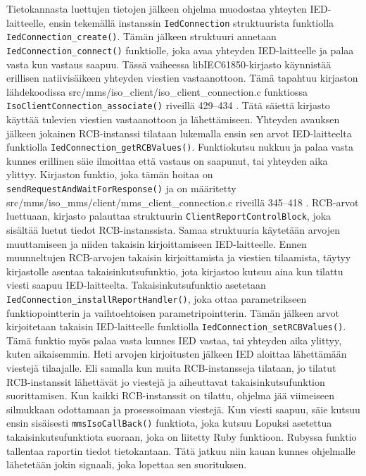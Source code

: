 Tietokannasta luettujen tietojen jälkeen ohjelma muodostaa yhteyten IED-laitteelle, ensin tekemällä instanssin \texttt{IedConnection} struktuurista funktiolla \texttt{IedConnection\_create()}. Tämän jälkeen struktuuri annetaan \texttt{IedConnection\_connect()} funktiolle, joka avaa yhteyden IED-laitteelle ja palaa vasta kun vastaus saapuu. Tässä vaiheessa libIEC61850-kirjasto käynnistää erillisen natiivisäikeen yhteyden viestien vastaanottoon. Tämä tapahtuu kirjaston lähdekoodissa src/mms/iso\_client/iso\_client\_connection.c funktiossa \texttt{IsoClientConnection\_associate()} riveillä 429--434 \cite{libIEC61850-repo}. Tätä säiettä kirjasto käyttää tulevien viestien vastaanottoon ja lähettämiseen. Yhteyden avauksen jälkeen jokainen RCB-instanssi tilataan lukemalla ensin sen arvot IED-laitteelta funktiolla \texttt{IedConnection\_getRCBValues()}. Funktiokutsu nukkuu ja palaa vasta kunnes erillinen säie ilmoittaa että vastaus on saapunut, tai yhteyden aika ylittyy. Kirjaston funktio, joka tämän hoitaa on \texttt{sendRequestAndWaitForResponse()} ja on määritetty src/mms/iso\_mms/client/mms\_client\_connection.c riveillä 345--418 \cite{libIEC61850-repo}. RCB-arvot luettuaan, kirjasto palauttaa struktuurin \texttt{ClientReportControlBlock}, joka sisältää luetut tiedot RCB-instanssista. Samaa struktuuria käytetään arvojen muuttamiseen ja niiden takaisin kirjoittamiseen IED-laitteelle. Ennen muunneltujen RCB-arvojen takaisin kirjoittamista ja viestien tilaamista, täytyy kirjastolle asentaa takaisinkutsufunktio, jota kirjastoo kutsuu aina kun tilattu viesti saapuu IED-laitteelta. Takaisinkutsufunktio asetetaan \texttt{IedConnection\_installReportHandler()}, joka ottaa parametrikseen funktiopointterin ja vaihtoehtoisen parametripointterin. Tämän jälkeen arvot kirjoitetaan takaisin IED-laitteelle funktiolla \texttt{IedConnection\_setRCBValues()}. Tämä funktio myös palaa vasta kunnes IED vastaa, tai yhteyden aika ylittyy, kuten aikaisemmin. Heti arvojen kirjoitusten jälkeen IED aloittaa lähettämään viestejä tilaajalle. Eli samalla kun muita RCB-instansseja tilataan, jo tilatut RCB-instanssit lähettävät jo viestejä ja aiheuttavat takaisinkutsufunktion suorittamisen. Kun kaikki RCB-instanssit on tilattu, ohjelma jää viimeiseen silmukkaan odottamaan ja prosessoimaan viestejä. Kun viesti saapuu, säie kutsuu ensin sisäisesti \texttt{mmsIsoCallBack()} funktiota, joka kutsuu Lopuksi asetettua takaisinkutsufunktiota suoraan, joka on liitetty Ruby funktioon. Rubyssa funktio tallentaa raportin tiedot tietokantaan. Tätä jatkuu niin kauan kunnes ohjelmalle lähetetään jokin signaali, joka lopettaa sen suorituksen. \cite{Kozlovski2017, Storimer2013}

